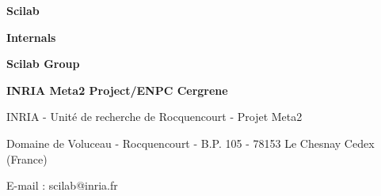 

\pagestyle{empty}


\hspace*{-2.cm}

\newpage

\vspace{8.cm}

{\Huge\bf  {Scilab}}

{\Huge\bf  {Internals}}

\vspace{3.cm}

{\Huge\bf {Scilab Group}}

{\Large\bf
INRIA Meta2 Project/ENPC Cergrene}

\normalsize

\vspace{12.cm}

INRIA - Unit\'e de recherche de Rocquencourt - Projet Meta2

Domaine de Voluceau - Rocquencourt - B.P. 105 - 78153 Le Chesnay Cedex (France)

E-mail : scilab@inria.fr

\newpage
\mbox{ }
\newpage

\normalsize

